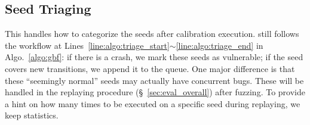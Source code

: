 \subsection{Seed Triaging}\label{sec:seed_save}
This handles how to categorize the seeds after calibration execution. \mtfuzz still follows the workflow at Lines~\ref{line:algo:triage_start}$\sim$\ref{line:algo:triage_end} in Algo.~\ref{algo:gbf}: if there is a crash, we mark these seeds as vulnerable; if the seed covers new transitions, we append it to the queue. One major difference is that these ``seemingly normal'' seeds may actually have concurrent bugs. These will be handled in the replaying procedure (\S~\ref{sec:eval_overall}) after fuzzing. To provide a hint on how many times to be executed on a specific seed during replaying, we keep \NcalTrace statistics.



